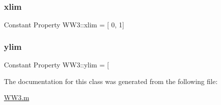 \mbox{\label{class_w_w3_abdd56b5e1ca6d0944b263403438d99f7}} 
\subsubsection{\texorpdfstring{xlim}{xlim}}
{\footnotesize\ttfamily Constant Property W\+W3\+::xlim = \mbox{[} 0, 1\mbox{]}}

\mbox{\label{class_w_w3_a930654d6c35905f1195b19ecf551af95}} 
\subsubsection{\texorpdfstring{ylim}{ylim}}
{\footnotesize\ttfamily Constant Property W\+W3\+::ylim = \mbox{[}}



The documentation for this class was generated from the following file\+:\begin{DoxyCompactItemize}
\item 
\hyperlink{_w_w3_8m}{W\+W3.\+m}\end{DoxyCompactItemize}
